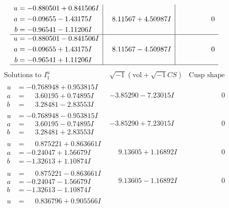 \documentclass[1p]{elsarticle_modified}
\theoremstyle{definition}
\newcommand{\I}{\sqrt{-1}}
\begin{document}
$$\begin{array}{c|c|c}
\begin{aligned}
u &= -0.880501 + 0.841506 I \\
a &= -0.09655 - 1.43175 I \\
b &= -0.96541 - 1.11206 I\end{aligned}
 & \phantom{-}8.11567 + 4.50987 I & \phantom{-0.000000 } 0 \\ \hline\begin{aligned}
u &= -0.880501 - 0.841506 I \\
a &= -0.09655 + 1.43175 I \\
b &= -0.96541 + 1.11206 I\end{aligned}
 & \phantom{-}8.11567 - 4.50987 I & \phantom{-0.000000 } 0\\
 \hline 
 \end{array}$$\newpage$$\begin{array}{c|c|c}  
\text{Solutions to }I^u_{1}& \I (\text{vol} + \sqrt{-1}CS) & \text{Cusp shape}\\
 \hline 
\begin{aligned}
u &= -0.768948 + 0.953815 I \\
a &= \phantom{-}3.60195 + 0.74895 I \\
b &= \phantom{-}3.28481 - 2.83553 I\end{aligned}
 & -3.85290 - 7.23015 I & \phantom{-0.000000 } 0 \\ \hline\begin{aligned}
u &= -0.768948 - 0.953815 I \\
a &= \phantom{-}3.60195 - 0.74895 I \\
b &= \phantom{-}3.28481 + 2.83553 I\end{aligned}
 & -3.85290 + 7.23015 I & \phantom{-0.000000 } 0 \\ \hline\begin{aligned}
u &= \phantom{-}0.875221 + 0.863661 I \\
a &= -0.24047 + 1.56679 I \\
b &= -1.32613 + 1.10874 I\end{aligned}
 & \phantom{-}9.13605 + 1.16892 I & \phantom{-0.000000 } 0 \\ \hline\begin{aligned}
u &= \phantom{-}0.875221 - 0.863661 I \\
a &= -0.24047 - 1.56679 I \\
b &= -1.32613 - 1.10874 I\end{aligned}
 & \phantom{-}9.13605 - 1.16892 I & \phantom{-0.000000 } 0 \\ \hline\begin{aligned}
u &= \phantom{-}0.836796 + 0.905566 I \\

\end{aligned}
\end{array}$$
\end{document}
